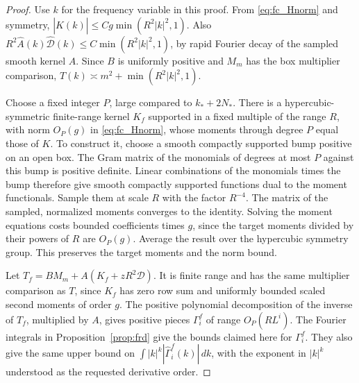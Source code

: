 \documentclass[11pt]{article}
\begin{document}
\begin{proof}
Use \(k\) for the frequency variable in this proof. From
\eqref{eq:fc_Hnorm} and symmetry,
\(|\widehat K(k)|\le Cg\min(R^2|k|^2,1)\). Also
\(R^2\widehat A(k)\widehat{\mathcal D}(k)\le C\min(R^2|k|^2,1)\),
by rapid Fourier decay of the sampled smooth kernel \(A\).
Since \(B\) is uniformly positive and \(M_m\) has the box multiplier
comparison, \(\widehat T(k)\asymp m^2+\min(R^2|k|^2,1)\).

Choose a fixed integer \(P\), large compared to \(k_*+2N_*\).
There is a hypercubic-symmetric finite-range kernel \(K_f\) supported
in a fixed multiple of the range \(R\), with norm \(O_P(g)\) in
\eqref{eq:fc_Hnorm}, whose moments through degree \(P\) equal those
of \(K\). To construct it, choose a smooth compactly supported bump
positive on an open box. The Gram matrix of the monomials of degrees
at most \(P\) against this bump is positive definite. Linear combinations
of the monomials times the bump therefore give smooth compactly
supported functions dual to the moment functionals. Sample them at
scale \(R\) with the factor \(R^{-4}\). The matrix of the sampled,
normalized moments converges to the identity. Solving the moment
equations costs bounded coefficients times \(g\), since the target
moments divided by their powers of \(R\) are \(O_P(g)\).
Average the result over the hypercubic symmetry group. This preserves
the target moments and the norm bound.

Let \(T_f=BM_m+A(K_f+zR^2\mathcal D)\). It is finite range and has
the same multiplier comparison as \(T\), since \(K_f\) has zero row
sum and uniformly bounded scaled second moments of order \(g\).
The positive polynomial decomposition of the inverse of \(T_f\),
multiplied by \(A\), gives positive pieces \(\Gamma_i^f\) of range
\(O_P(RL^i)\). The Fourier integrals in Proposition~\ref{prop:frd}
give the bounds claimed here for \(\Gamma_i^f\). They also give the
same upper bound on
\(\int |k|^k |\widehat\Gamma_i^f(k)|\,dk\), with the exponent in
\(|k|^k\) understood as the requested derivative order.


\end{proof}
\end{document}
